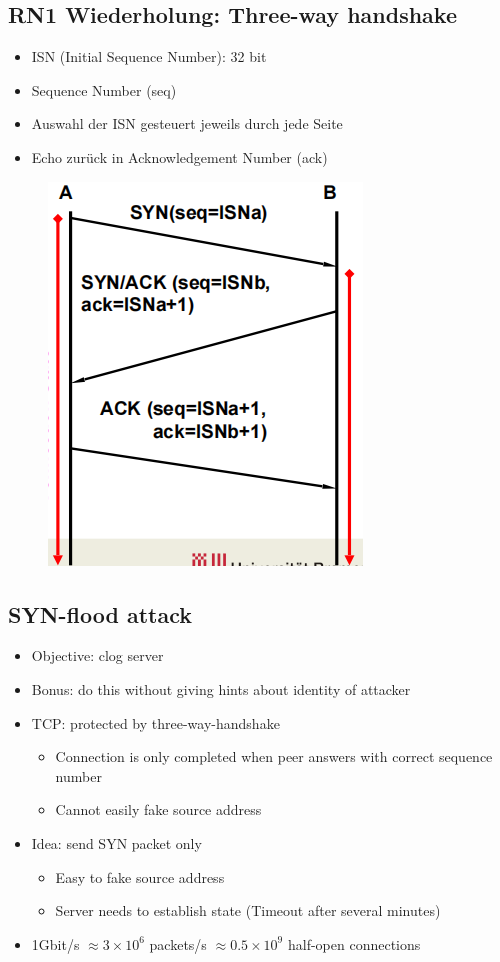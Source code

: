 \documentclass[openany]{book}
\begin{document}
\subsection{RN1 Wiederholung: Three-way handshake}

\begin{itemize}
    \item ISN (Initial Sequence Number): 32 bit
    \item Sequence Number (seq)
    \item Auswahl der ISN gesteuert jeweils durch jede Seite
    \item Echo zurück in Acknowledgement Number (ack)
\end{itemize}

\begin{figure}[h!]
    \centering
    \includegraphics[width=0.45\linewidth]{Pics/ThreeWayHandshake.PNG}
\end{figure}

\newpage

\subsection{SYN-flood attack}

\begin{itemize}
    \item Objective: clog server
    \item Bonus: do this without giving hints about identity of attacker
    \item TCP: protected by three-way-handshake
    \begin{itemize}
        \item Connection is only completed when peer answers with correct sequence number
        \item Cannot easily fake source address
    \end{itemize}
    \item Idea: send SYN packet only
    \begin{itemize}
        \item Easy to fake source address
        \item Server needs to establish state (Timeout after several minutes)
    \end{itemize}
    \item 1Gbit/s $\approx 3\times 10^6$ packets/s $\approx 0.5\times 10^9$ half-open connections
\end{itemize}
\end{document}
